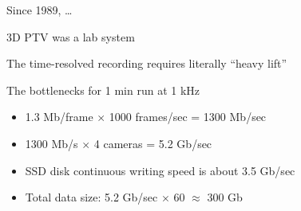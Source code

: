 
% 




% 

\begin{frame}[label=real-31]{Since 1989, \ldots }
    \centering{}
\end{frame}

    
\begin{frame}[label=real-3]{3D PTV  was a lab system}
    \centering{}
\end{frame}

\begin{frame}[label=real-4]{The time-resolved recording requires literally ``heavy lift''}
\begin{multicols}{2}
\end{multicols}
\end{frame}





\begin{frame}[label=real-66]{The bottlenecks for 1 min run at 1 kHz}
\begin{card}
\begin{itemize}
\item 1.3 Mb/frame $\times$ 1000 frames/sec = 1300 Mb/sec
\item 1300 Mb/s $\times$ 4 cameras = 5.2 Gb/sec
\item SSD disk continuous writing speed is about 3.5 Gb/sec
\item Total data size: 5.2 Gb/sec $\times$ 60 $\approx$ 300 Gb
\end{itemize}

\end{card}
\end{frame}

